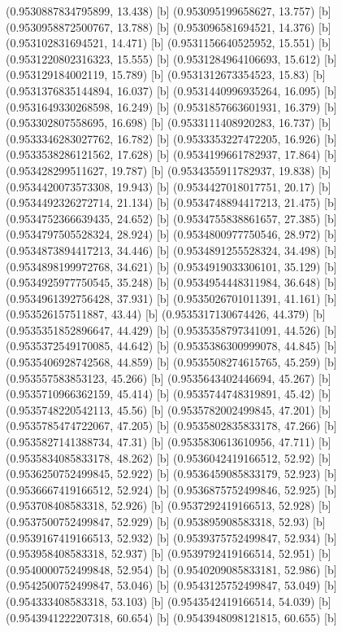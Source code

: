 {{{(0.9530887834795899, 13.438) [b] 
(0.953095199658627, 13.757) [b] 
(0.9530958872500767, 13.788) [b] 
(0.953096581694521, 14.376) [b] 
(0.953102831694521, 14.471) [b] 
(0.9531156640525952, 15.551) [b] 
(0.9531220802316323, 15.555) [b] 
(0.9531284964106693, 15.612) [b] 
(0.953129184002119, 15.789) [b] 
(0.9531312673354523, 15.83) [b] 
(0.9531376835144894, 16.037) [b] 
(0.9531440996935264, 16.095) [b] 
(0.9531649330268598, 16.249) [b] 
(0.9531857663601931, 16.379) [b] 
(0.953302807558695, 16.698) [b] 
(0.9533111408920283, 16.737) [b] 
(0.9533346283027762, 16.782) [b] 
(0.9533353227472205, 16.926) [b] 
(0.9533538286121562, 17.628) [b] 
(0.9534199661782937, 17.864) [b] 
(0.953428299511627, 19.787) [b] 
(0.9534355911782937, 19.838) [b] 
(0.9534420073573308, 19.943) [b] 
(0.9534427018017751, 20.17) [b] 
(0.9534492326272714, 21.134) [b] 
(0.9534748894417213, 21.475) [b] 
(0.9534752366639435, 24.652) [b] 
(0.9534755838861657, 27.385) [b] 
(0.9534797505528324, 28.924) [b] 
(0.9534800977750546, 28.972) [b] 
(0.9534873894417213, 34.446) [b] 
(0.9534891255528324, 34.498) [b] 
(0.9534898199972768, 34.621) [b] 
(0.9534919033306101, 35.129) [b] 
(0.9534925977750545, 35.248) [b] 
(0.9534954448311984, 36.648) [b] 
(0.9534961392756428, 37.931) [b] 
(0.9535026701011391, 41.161) [b] 
(0.953526157511887, 43.44) [b] 
(0.9535317130674426, 44.379) [b] 
(0.9535351852896647, 44.429) [b] 
(0.9535358797341091, 44.526) [b] 
(0.9535372549170085, 44.642) [b] 
(0.9535386300999078, 44.845) [b] 
(0.9535406928742568, 44.859) [b] 
(0.9535508274615765, 45.259) [b] 
(0.953557583853123, 45.266) [b] 
(0.9535643402446694, 45.267) [b] 
(0.9535710966362159, 45.414) [b] 
(0.9535744748319891, 45.42) [b] 
(0.9535748220542113, 45.56) [b] 
(0.9535782002499845, 47.201) [b] 
(0.9535785474722067, 47.205) [b] 
(0.9535802835833178, 47.266) [b] 
(0.9535827141388734, 47.31) [b] 
(0.9535830613610956, 47.711) [b] 
(0.9535834085833178, 48.262) [b] 
(0.9536042419166512, 52.92) [b] 
(0.9536250752499845, 52.922) [b] 
(0.9536459085833179, 52.923) [b] 
(0.9536667419166512, 52.924) [b] 
(0.9536875752499846, 52.925) [b] 
(0.953708408583318, 52.926) [b] 
(0.9537292419166513, 52.928) [b] 
(0.9537500752499847, 52.929) [b] 
(0.953895908583318, 52.93) [b] 
(0.9539167419166513, 52.932) [b] 
(0.9539375752499847, 52.934) [b] 
(0.953958408583318, 52.937) [b] 
(0.9539792419166514, 52.951) [b] 
(0.9540000752499848, 52.954) [b] 
(0.9540209085833181, 52.986) [b] 
(0.9542500752499847, 53.046) [b] 
(0.9543125752499847, 53.049) [b] 
(0.954333408583318, 53.103) [b] 
(0.9543542419166514, 54.039) [b] 
(0.9543941222207318, 60.654) [b] 
(0.9543948098121815, 60.655) [b] 
}}}
